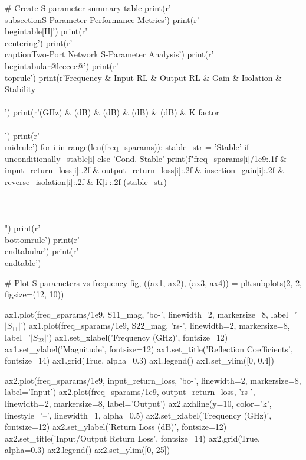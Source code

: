 \documentclass[11pt,a4paper]{article}
\begin{document}
\begin{pycode}
# Create S-parameter summary table
print(r'\\subsection{S-Parameter Performance Metrics}')
print(r'\\begin{table}[H]')
print(r'\\centering')
print(r'\\caption{Two-Port Network S-Parameter Analysis}')
print(r'\\begin{tabular}{@{}lccccc@{}}')
print(r'\\toprule')
print(r'Frequency & Input RL & Output RL & Gain & Isolation & Stability \\\\')
print(r'(GHz) & (dB) & (dB) & (dB) & (dB) & K factor \\\\')
print(r'\\midrule')
for i in range(len(freq_sparams)):
    stable_str = 'Stable' if unconditionally_stable[i] else 'Cond. Stable'
    print(f"{freq_sparams[i]/1e9:.1f} & {input_return_loss[i]:.2f} & {output_return_loss[i]:.2f} & {insertion_gain[i]:.2f} & {reverse_isolation[i]:.2f} & {K[i]:.2f} ({stable_str}) \\\\\\\\")
print(r'\\bottomrule')
print(r'\\end{tabular}')
print(r'\\end{table}')

# Plot S-parameters vs frequency
fig, ((ax1, ax2), (ax3, ax4)) = plt.subplots(2, 2, figsize=(12, 10))

ax1.plot(freq_sparams/1e9, S11_mag, 'bo-', linewidth=2, markersize=8, label='$|S_{11}|$')
ax1.plot(freq_sparams/1e9, S22_mag, 'rs-', linewidth=2, markersize=8, label='$|S_{22}|$')
ax1.set_xlabel('Frequency (GHz)', fontsize=12)
ax1.set_ylabel('Magnitude', fontsize=12)
ax1.set_title('Reflection Coefficients', fontsize=14)
ax1.grid(True, alpha=0.3)
ax1.legend()
ax1.set_ylim([0, 0.4])

ax2.plot(freq_sparams/1e9, input_return_loss, 'bo-', linewidth=2, markersize=8, label='Input')
ax2.plot(freq_sparams/1e9, output_return_loss, 'rs-', linewidth=2, markersize=8, label='Output')
ax2.axhline(y=10, color='k', linestyle='--', linewidth=1, alpha=0.5)
ax2.set_xlabel('Frequency (GHz)', fontsize=12)
ax2.set_ylabel('Return Loss (dB)', fontsize=12)
ax2.set_title('Input/Output Return Loss', fontsize=14)
ax2.grid(True, alpha=0.3)
ax2.legend()
ax2.set_ylim([0, 25])


\end{pycode}
\end{document}
